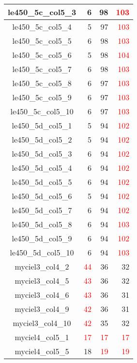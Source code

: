 \begin{longtable}{|c|r|r|r|}
  le450\_5c\_col5\_3 & 6 & 98 & \textcolor{red}{103} \\ \hline
  le450\_5c\_col5\_4 & 5 & 97 & \textcolor{red}{103} \\ \hline
  le450\_5c\_col5\_5 & 6 & 98 & \textcolor{red}{103} \\ \hline
  le450\_5c\_col5\_6 & 5 & 98 & \textcolor{red}{104} \\ \hline
  le450\_5c\_col5\_7 & 6 & 98 & \textcolor{red}{103} \\ \hline
  le450\_5c\_col5\_8 & 6 & 97 & \textcolor{red}{103} \\ \hline
  le450\_5c\_col5\_9 & 6 & 97 & \textcolor{red}{103} \\ \hline
  le450\_5c\_col5\_10 & 6 & 97 & \textcolor{red}{103} \\ \hline
  le450\_5d\_col5\_1 & 5 & 94 & \textcolor{red}{102} \\ \hline
  le450\_5d\_col5\_2 & 5 & 94 & \textcolor{red}{102} \\ \hline
  le450\_5d\_col5\_3 & 6 & 94 & \textcolor{red}{102} \\ \hline
  le450\_5d\_col5\_4 & 6 & 94 & \textcolor{red}{102} \\ \hline
  le450\_5d\_col5\_5 & 6 & 94 & \textcolor{red}{102} \\ \hline
  le450\_5d\_col5\_6 & 5 & 94 & \textcolor{red}{102} \\ \hline
  le450\_5d\_col5\_7 & 6 & 94 & \textcolor{red}{102} \\ \hline
  le450\_5d\_col5\_8 & 6 & 94 & \textcolor{red}{103} \\ \hline
  le450\_5d\_col5\_9 & 6 & 94 & \textcolor{red}{102} \\ \hline
  le450\_5d\_col5\_10 & 6 & 94 & \textcolor{red}{103} \\ \hline
  myciel3\_col4\_2 & \textcolor{red}{44} & 36 & 32 \\ \hline
  myciel3\_col4\_5 & \textcolor{red}{43} & 36 & 32 \\ \hline
  myciel3\_col4\_6 & \textcolor{red}{43} & 36 & 31 \\ \hline
  myciel3\_col4\_9 & \textcolor{red}{42} & 36 & 31 \\ \hline
  myciel3\_col4\_10 & \textcolor{red}{42} & 35 & 32 \\ \hline
  myciel4\_col5\_1 & \textcolor{red}{17} & \textcolor{red}{17} & \textcolor{red}{17} \\ \hline
  myciel4\_col5\_5 & 18 & \textcolor{red}{19} & \textcolor{red}{19} \\ \hline

\end{longtable}
